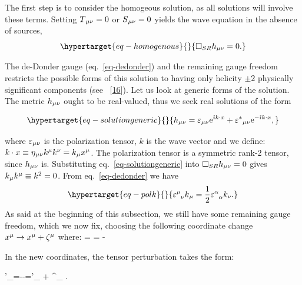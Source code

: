 \documentclass[
  10pt,
  a4paper,
  DIV=11,
  numbers=noendperiod,
  twoside]{scrreprt}
\let\[\relax \let\]\relax %
\DeclareRobustCommand{\[}{\begin{equation}}
\DeclareRobustCommand{\]}{\end{equation}}
\begin{document}
The first step is to consider the homogeous solution, as all solutions
will involve these terms. Setting \(\SEco=0\) or \(\srcco=0\) yields the
wave equation in the absence of sources,
\begin{equation}\protect\hypertarget{eq-homogenous}{}{
   \SRDA \weakmet = 0 .
}\label{eq-homogenous}\end{equation}

The de-Donder gauge (eq.~\ref{eq-dedonder}) and the remaining gauge
freedom restricts the
possible forms of this solution to having only helicity \(\pm2\)
physically significant components (see
~{[}\protect\hyperlink{ref-Weinberg:1972}{16}{]}). Let us look at
generic forms of the solution. The metric \(\weakmet\) ought to be
real-valued, thus we seek real solutions of the form

\begin{equation}\protect\hypertarget{eq-solutiongeneric}{}{
    \weakmet = \polco \exp{\im k\cdot x} + \conjpolco \exp{-\im k\cdot x},
}\label{eq-solutiongeneric}\end{equation}

where \(\polco\) is the polarization tensor, \(k\) is the wave vector
and we define:
\(k\cdot x\equiv \mink \ct{k} \ct[\nu]{k} = \co{k} \ct{x}\). The
polarization tensor is a symmetric rank-2 tensor, since \(\weakmet\) is.
Substituting eq.~\ref{eq-solutiongeneric} into \(\SRDA\weakmet=0\) gives
\(\co{k} \ct{k} \equiv k^2=0\).  From eq.~\ref{eq-dedonder} we have
\begin{equation}\protect\hypertarget{eq-polk}{}{
    \polmix \co{k} = \frac{1}{2}\trpol k_\nu.
}\label{eq-polk}\end{equation} As said at the beginning of this
subsection, we still have some remaining gauge freedom, which we now
fix, choosing the following coordinate change
\(\ct{x}\to\ct{x}+\ct{\zeta}\) where: \[
\ct{\zeta}=\im {}     =  - \im {} 
\]

In the new coordinates, the tensor perturbation takes the form:

\[
\weakTensor'_{\mu\nu}=\weakmet--=\polTensor'_{\mu\nu}  + \polTensor^{\prime\ast}{}_{\mu\nu} .
\]
\end{document}
